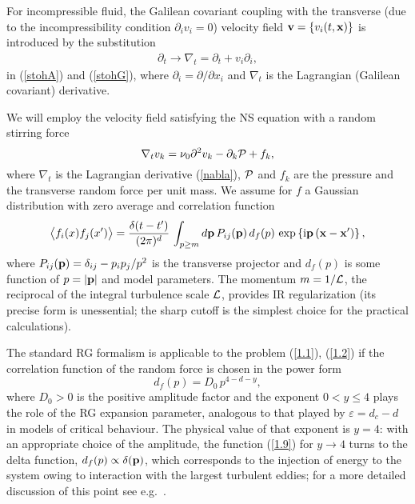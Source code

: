 \documentclass[12pt]{iopart}
\begin{document}
For incompressible fluid, the Galilean covariant coupling with the
transverse (due to the incompressibility condition $\partial_i v_i=0$)
velocity field ${\bf v}= \{ v_{i}(t, {\bf x}) \}$ is introduced by
the substitution
\begin{eqnarray}
\partial_{t} \to \nabla_{t} = \partial_{t} + v_{i} \partial_{i},
\label{nabla}
\end{eqnarray}
in (\ref{stohA}) and (\ref{stohG}), where
$\partial_i = \partial /\partial x_{i}$ and $\nabla_{t}$ is the
Lagrangian (Galilean covariant) derivative.

We will employ the velocity field satisfying the NS equation with a
random stirring force
\begin{equation}
\nabla _t v_k=\nu _0\partial^{2} v _k-\partial _k {\cal P}+f_k,
\label{1.1}
\end{equation}
where $\nabla _t$ is the Lagrangian derivative (\ref{nabla}),
${\cal P}$ and $f_k$ are the pressure
and the transverse random force per unit mass. We assume for $f$
a Gaussian distribution with zero average and correlation function
\begin{equation}
\big\langle f_i(x)f_j(x')\big\rangle = \frac{\delta (t-t')}{(2\pi)^{d}}\,
\int_{p\ge m} d{\bf p}\, P_{ij}({\bf p})\, d_f(p)\, \exp
\left\{{\rm i}{\bf p} \left({\bf x}-{\bf x}'\right)\right\} ,
\label{1.2}
\end{equation}
where $P_{ij}({\bf p}) =\delta _{ij}  - p_i p_j / p^2$ is the transverse
projector and $d_f(p)$ is some function of $p= |{\bf p}|$ and model
parameters. The momentum $m=1/{\cal L}$, the reciprocal of the integral
turbulence scale ${\cal L}$, provides IR regularization (its precise form
is unessential;
the sharp cutoff is the simplest choice for the practical calculations).


The standard RG formalism is applicable to the problem (\ref{1.1}),
(\ref{1.2}) if the correlation function of the random force is chosen
in the power form
\begin{equation}
d_f(p)=D_0\,p^{4-d-y},
\label{1.9}
\end{equation}
where $D_{0}>0$ is the positive amplitude factor and the exponent
$0<y\le 4$ plays the role of the RG expansion parameter, analogous
to that played by $\varepsilon=d_c-d$ in models of critical behaviour.
The physical value of that exponent is $y=4$: with an appropriate
choice of the amplitude,
the function (\ref{1.9}) for $y\to4$ turns to the delta function,
$d_f(p) \propto \delta({\bf p})$, which corresponds to the injection
of energy to the system owing to interaction with the largest
turbulent eddies; for a more detailed discussion of this point
see e.g.~\cite{Book3,turbo}.
\end{document}

